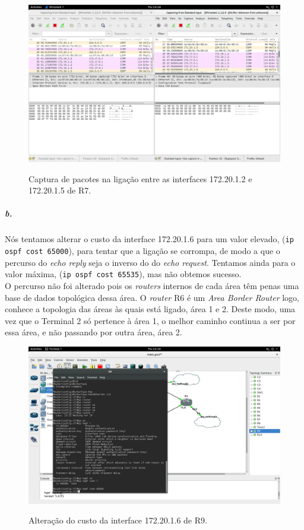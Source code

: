 \begin{figure}[h]
\centering
\includegraphics[width=1\textwidth, height=0.45\textheight]{4a.png}
\label{fig:captura R7}
\caption{Captura de pacotes na ligação entre as interfaces 172.20.1.2 e 172.20.1.5 de \textsf{R7}.}
\end{figure}

\subparagraph{b.}
Nós tentamos alterar o custo da interface 172.20.1.6 para um valor elevado, (\texttt{ip ospf cost 65000}), para tentar que a ligação se corrompa, de modo a que o percurso do \emph{echo reply} seja o inverso do do \emph{echo request}. Tentamos ainda para o valor máxima, (\texttt{ip ospf cost 65535}), mas não obtemos sucesso.\\
O percurso não foi alterado pois os \emph{routers} internos de cada área têm penas uma base de dados topológica dessa área. O \emph{router} \textsf{R6} é um \emph{Area Border Router} logo, conhece a topologia das áreas às quais está ligado, área 1 e 2. Deste modo, uma vez que o \textsf{Terminal 2} só pertence à área 1, o melhor caminho continua a ser por essa área, e não passando por outra área, área 2.

\begin{figure}[h]
\centering
\includegraphics[width=1\textwidth, height=0.45\textheight]{4b.png}
\label{fig:custo da interface}
\caption{Alteração do custo da interface 172.20.1.6 de \textsf{R9}.}
\end{figure}

